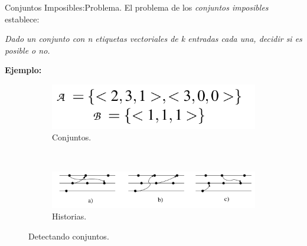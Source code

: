 \begin{frame}[fragile]{Conjuntos Imposibles:}{Problema.}
  \justifying
  El problema de los \textit{conjuntos imposibles} establece:
  \begin{center}
    \textit{Dado un conjunto con n etiquetas vectoriales de k entradas cada una, decidir si
    es posible o no.}
  \end{center}

  \textbf{Ejemplo:}
  \begin{figure}
    \centering
    \begin{subfigure}[b]{0.3\textwidth}
      \includegraphics[width=\textwidth]{./Imagenes/Conjuntos}
        \caption{Conjuntos.}
        \label{fig:Conjuntos.}
    \end{subfigure}
    ~ %
    \begin{subfigure}[b]{0.7\textwidth}
        \includegraphics[width=\textwidth]{./Imagenes/Historia}
        \caption{Historias.}
        \label{fig:Historias.}
    \end{subfigure}
    \caption{Detectando conjuntos.}\label{fig:ConjuntosImposibles.}
\end{figure}
\end{frame}
